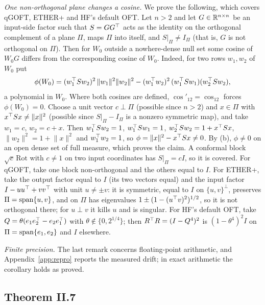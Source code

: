 \emph{One non-orthogonal plane changes a cosine.} We prove the following, which covers qGOFT, ETHER+ and HF's default OFT.
Let $n>2$ and let $G\in\mathbb{R}^{n\times n}$ be an input-side factor such that $S=GG^{\top}$ acts as the identity on the orthogonal
complement of a plane $\Pi$, maps $\Pi$ into itself, and $S|_\Pi\ne I_\Pi$ (that is, $G$ is not orthogonal on $\Pi$).
Then for $W_0$ outside a nowhere-dense null set some cosine of $W_0G$ differs from the corresponding cosine of $W_0$.
Indeed, for two rows $w_1,w_2$ of $W_0$ put
\begin{equation*}
  \phi(W_0)=(w_1^{\top} Sw_2)^2\,\lVert w_1\rVert^2\lVert w_2\rVert^2-(w_1^{\top} w_2)^2\,(w_1^{\top} Sw_1)(w_2^{\top} Sw_2),
\end{equation*}
a polynomial in $W_0$. Where both cosines are defined, $\cos'_{12}=\cos_{12}$ forces $\phi(W_0)=0$. Choose a unit vector
$c\perp\Pi$ (possible since $n>2$) and $x\in\Pi$ with $x^{\top} Sx\ne\lVert x\rVert^2$ (possible since $S|_\Pi-I_\Pi$ is a
nonzero symmetric map), and take $w_1=c$, $w_2=c+x$. Then $w_1^{\top} Sw_2=1$, $w_1^{\top} Sw_1=1$, $w_2^{\top} Sw_2=1+x^{\top} Sx$,
$\lVert w_2\rVert^2=1+\lVert x\rVert^2$ and $w_1^{\top} w_2=1$, so $\phi=\lVert x\rVert^2-x^{\top} Sx\ne0$. By (b), $\phi\ne0$
on an open dense set of full measure, which proves the claim. A conformal block $\sqrt c\,\mathrm{Rot}$ with $c\ne1$ on two
input coordinates has $S|_\Pi=cI$, so it is covered. For qGOFT, take one block non-orthogonal and the others equal to $I$. For
ETHER+, take the output factor equal to $I$ (its two vectors equal) and the input factor $I-uu^{\top}+vv^{\top}$ with unit $u\ne\pm v$:
it is symmetric, equal to $I$ on $\{u,v\}^\perp$, preserves $\Pi=\operatorname{span}\{u,v\}$, and on $\Pi$ has eigenvalues
$1\pm(1-(u^{\top} v)^2)^{1/2}$, so it is not orthogonal there; for $u\perp v$ it kills $u$ and is singular. For HF's default
OFT, take $Q=\theta(e_1e_2^{\top}-e_2e_1^{\top})$ with $\theta\notin\{0,2^{1/4}\}$; then $R^{\top} R=(I-Q^4)^2$ is $(1-\theta^4)^2I$ on
$\Pi=\operatorname{span}\{e_1,e_2\}$ and $I$ elsewhere.

\emph{Finite precision.} The last remark concerns floating-point arithmetic, and Appendix~\ref{app:repro} reports the
measured drift; in exact arithmetic the corollary holds as proved.

\subsection{Theorem II.7}\label{proof:II.7}

